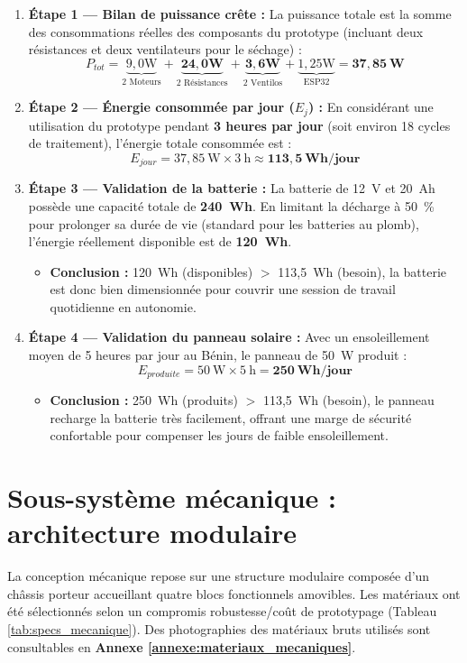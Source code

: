 \begin{enumerate}
    \item \textbf{Étape 1 — Bilan de puissance crête :} La puissance totale est la somme des consommations réelles des composants du prototype (incluant deux résistances et deux ventilateurs pour le séchage) :
    \[ P_{tot} = \underbrace{9,0\text{W}}_{\text{2 Moteurs}} + \underbrace{\mathbf{24,0\text{W}}}_{\text{2 Résistances}} + \underbrace{\mathbf{3,6\text{W}}}_{\text{2 Ventilos}} + \underbrace{1,25\text{W}}_{\text{ESP32}} = \mathbf{37,85~\text{W}} \]
    
    \item \textbf{Étape 2 — Énergie consommée par jour ($E_j$) :} En considérant une utilisation du prototype pendant \textbf{3 heures par jour} (soit environ 18 cycles de traitement), l'énergie totale consommée est :
    \[ E_{jour} = 37,85~\text{W} \times 3~\text{h} \approx \mathbf{113,5~\text{Wh/jour}} \]
    
    \item \textbf{Étape 3 — Validation de la batterie :} La batterie de 12~V et 20~Ah possède une capacité totale de \textbf{240~Wh}. En limitant la décharge à 50~\% pour prolonger sa durée de vie (standard pour les batteries au plomb), l'énergie réellement disponible est de \textbf{120~Wh}.
    \begin{itemize}
        \item \textbf{Conclusion :} 120~Wh (disponibles) $>$ 113,5~Wh (besoin), la batterie est donc bien dimensionnée pour couvrir une session de travail quotidienne en autonomie.
    \end{itemize}

    \item \textbf{Étape 4 — Validation du panneau solaire :} Avec un ensoleillement moyen de 5 heures par jour au Bénin, le panneau de 50~W produit :
    \[ E_{produite} = 50~\text{W} \times 5~\text{h} = \mathbf{250~\text{Wh/jour}} \]
    \begin{itemize}
        \item \textbf{Conclusion :} 250~Wh (produits) $>$ 113,5~Wh (besoin), le panneau recharge la batterie très facilement, offrant une marge de sécurité confortable pour compenser les jours de faible ensoleillement.
    \end{itemize}
\end{enumerate}

\section{Sous-système mécanique : architecture modulaire}
La conception mécanique repose sur une structure modulaire composée d'un châssis porteur accueillant quatre blocs fonctionnels amovibles. Les matériaux ont été sélectionnés selon un compromis robustesse/coût de prototypage (Tableau \ref{tab:specs_mecanique}). Des photographies des matériaux bruts utilisés sont consultables en \textbf{Annexe \ref{annexe:materiaux_mecaniques}}.

